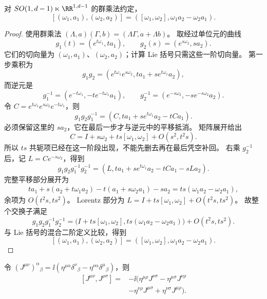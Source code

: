 \begin{proposition}
对 $SO(1,d-1)\ltimes\RR^{1,d-1}$ 的群乘法约定，\[[(\omega_1,a_1),(\omega_2,a_2)]=([\omega_1,\omega_2],\omega_1a_2-\omega_2a_1).\]
\end{proposition}

\begin{proof}
使用群乘法 $(\Lambda,a)(\Gamma,b)=(\Lambda\Gamma,a+\Lambda b)$。
取经过单位元的曲线
\[
g_1(t)=(e^{t\omega_1},ta_1),\qquad
g_2(s)=(e^{s\omega_2},sa_2).
\]
它们的切向量为 $(\omega_1,a_1)$、$(\omega_2,a_2)$；计算 Lie 括号只需这些一阶切向量。
第一步乘积为
\[
g_1g_2=(e^{t\omega_1}e^{s\omega_2},ta_1+s e^{t\omega_1}a_2),
\]
而逆元是
\[
g_1^{-1}=(e^{-t\omega_1},-t e^{-t\omega_1}a_1),\qquad
g_2^{-1}=(e^{-s\omega_2},-s e^{-s\omega_2}a_2).
\]
令 $C=e^{t\omega_1}e^{s\omega_2}e^{-t\omega_1}$，则
\[
g_1g_2g_1^{-1}=(C,ta_1+s e^{t\omega_1}a_2-tCa_1).
\]
必须保留这里的 $sa_2$，它在最后一步才与逆元中的平移抵消。
矩阵展开给出
\[
C=I+s\omega_2+ts[\omega_1,\omega_2]+O(s^2,t^2s).
\]
所以 $ts$ 共轭项已经在这一阶段出现，不能先删去再在最后凭空补回。
右乘 $g_2^{-1}$ 后，记 $L=Ce^{-s\omega_2}$，得到
\[
g_1g_2g_1^{-1}g_2^{-1}
=(L,ta_1+s e^{t\omega_1}a_2-tCa_1-sLa_2).
\]
完整平移部分展开为
\[
\begin{aligned}
ta_1+s(a_2+t\omega_1a_2)
-t(a_1+s\omega_2a_1)-sa_2
=ts(\omega_1a_2-\omega_2a_1),
\end{aligned}
\]
余项为 $O(t^2s,ts^2)$。
Lorentz 部分为 $L=I+ts[\omega_1,\omega_2]+O(t^2s,ts^2)$。
故整个交换子满足
\[
g_1g_2g_1^{-1}g_2^{-1}
=\bigl(I+ts[\omega_1,\omega_2],ts(\omega_1a_2-\omega_2a_1)\bigr)
+O(t^2s,ts^2).
\]
与 Lie 括号的混合二阶定义比较，得到
\begin{equation}\label{eq:ms-poincare-unified-bracket}
\boxed{[(\omega_1,a_1),(\omega_2,a_2)]
=([\omega_1,\omega_2],\omega_1a_2-\omega_2a_1).}
\end{equation}
\end{proof}

\begin{proposition}
令 $(J^{\mu\nu})^\alpha{}_{\beta}=\ii(\eta^{\mu\alpha}\delta^\nu{}_{\beta}-\eta^{\nu\alpha}\delta^\mu{}_{\beta})$，则\[\begin{aligned}{}[J^{\mu\nu},J^{\rho\sigma}]={}&-\ii(\eta^{\mu\rho}J^{\nu\sigma}-\eta^{\mu\sigma}J^{\nu\rho}\\&-\eta^{\nu\rho}J^{\mu\sigma}+\eta^{\nu\sigma}J^{\mu\rho}).\end{aligned}\]
\end{proposition}

